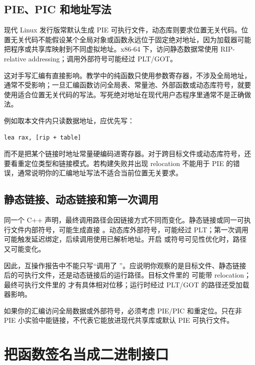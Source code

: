\subsection{PIE、PIC 和地址写法}

现代 Linux 发行版常默认生成 PIE 可执行文件，动态库则要求位置无关代码。位置无关代码不能假设某个全局对象或函数永远位于固定绝对地址，因为加载器可能把程序或共享库映射到不同虚拟地址。x86-64 下，访问静态数据常使用 RIP-relative addressing；调用外部符号可能经过 PLT/GOT。

这对手写汇编有直接影响。教学中的纯函数只使用参数寄存器，不涉及全局地址，通常不受影响；一旦汇编函数访问全局表、常量池、外部函数或动态库符号，就要使用适合位置无关代码的写法。写死绝对地址在现代用户态程序里通常不是正确做法。

例如取本文件内只读数据地址，应优先写：

\begin{lstlisting}
lea rax, [rip + table]
\end{lstlisting}

而不是把某个链接时地址常量硬编码进寄存器。对于跨目标文件或动态库符号，还要看重定位类型和链接模式。若构建失败并出现 relocation 不能用于 PIE 的错误，通常说明你的汇编地址写法不适合当前位置无关要求。

\subsection{静态链接、动态链接和第一次调用}

同一个 C++ 声明，最终调用路径会因链接方式不同而变化。静态链接或同一可执行文件内部符号，可能生成直接 。动态库外部符号，可能经过 PLT；第一次调用可能触发延迟绑定，后续调用使用已解析地址。开启  或符号可见性优化时，路径又可能变化。

因此，互操作报告中不能只写“调用了 ”。应说明你观察的是目标文件、静态链接后的可执行文件，还是动态链接后的运行路径。目标文件里的  可能带 relocation；最终可执行文件里的  才有具体相对位移；运行时经过 PLT/GOT 的路径还受加载器影响。

\begin{warningbox}
如果你的汇编访问全局数据或外部符号，必须考虑 PIE/PIC 和重定位。只在非 PIE 小实验中能链接，不代表它能放进现代共享库或默认 PIE 可执行文件。
\end{warningbox}

\section{把函数签名当成二进制接口}

